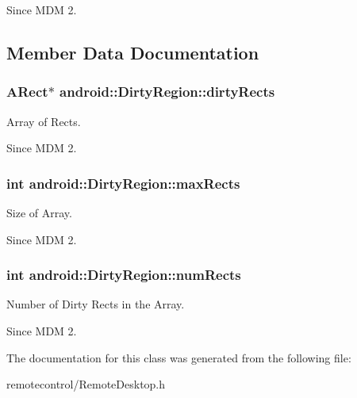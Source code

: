 \begin{DoxySince}{\-Since}
\-M\-D\-M 2. 
\end{DoxySince}


\subsection{\-Member \-Data \-Documentation}
\hypertarget{classandroid_1_1DirtyRegion_af955c947f1cbfd7d8d3ac2ebc1f4dd1c}{
\subsubsection[{dirty\-Rects}]{\setlength{\rightskip}{0pt plus 5cm}\-A\-Rect$\ast$ {\bf android\-::\-Dirty\-Region\-::dirty\-Rects}}}\label{classandroid_1_1DirtyRegion_af955c947f1cbfd7d8d3ac2ebc1f4dd1c}


\-Array of \-Rects. 

\begin{DoxySince}{\-Since}
\-M\-D\-M 2. 
\end{DoxySince}
\hypertarget{classandroid_1_1DirtyRegion_ac278f2e84eea4692a961951fefefa598}{
\subsubsection[{max\-Rects}]{\setlength{\rightskip}{0pt plus 5cm}int {\bf android\-::\-Dirty\-Region\-::max\-Rects}}}\label{classandroid_1_1DirtyRegion_ac278f2e84eea4692a961951fefefa598}


\-Size of \-Array. 

\begin{DoxySince}{\-Since}
\-M\-D\-M 2. 
\end{DoxySince}
\hypertarget{classandroid_1_1DirtyRegion_aeabb1d1a06ce3c442297c665d3f8fae2}{
\subsubsection[{num\-Rects}]{\setlength{\rightskip}{0pt plus 5cm}int {\bf android\-::\-Dirty\-Region\-::num\-Rects}}}\label{classandroid_1_1DirtyRegion_aeabb1d1a06ce3c442297c665d3f8fae2}


\-Number of \-Dirty \-Rects in the \-Array. 

\begin{DoxySince}{\-Since}
\-M\-D\-M 2. 
\end{DoxySince}


\-The documentation for this class was generated from the following file\-:\begin{DoxyCompactItemize}
\item 
remotecontrol/\-Remote\-Desktop.\-h\end{DoxyCompactItemize}
